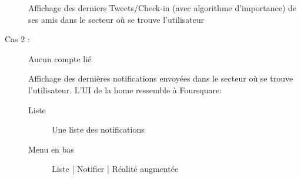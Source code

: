 \documentclass[a4paper,12pt]{report}
\begin{document}
\begin{onehalfspace}
\begin{description}
    Affichage des derniers Tweets/Check-in (avec algorithme d’importance) de ses amis dans le secteur où se trouve l’utilisateur

    \item[Cas 2 :] Aucun compte lié

    Affichage des dernières notifications envoyées dans le secteur où se trouve l’utilisateur.
    L’UI de la home ressemble à Foursquare:
      \begin{description}
      \item[Liste] Une liste des notifications
      \item[Menu en bas] Liste | Notifier | Réalité augmentée
      \end{description}
  \end{description}

  \end{onehalfspace}
\end{document}
